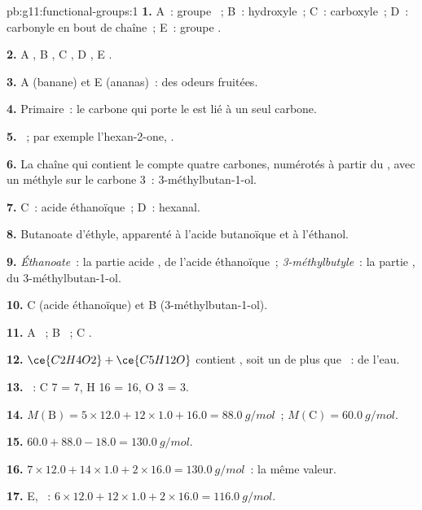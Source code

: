 \begin{solution}{pb:g11:functional-groups:1}
\textbf{1.} A~: groupe ~; B~: hydroxyle~; C~: carboxyle~; D~:
carbonyle en bout de chaîne~; E~: groupe .

\textbf{2.} A , B , C , D , E .

\textbf{3.} A (banane) et E (ananas)~: des odeurs fruitées.

\textbf{4.} Primaire~: le carbone qui porte le  est lié à un seul
carbone.

\textbf{5.} ~; par exemple l'hexan-2-one,
.

\textbf{6.} La chaîne qui contient le  compte quatre carbones,
numérotés à partir du , avec un méthyle sur le carbone 3~:
3-méthylbutan-1-ol.

\textbf{7.} C~: acide éthanoïque~; D~: hexanal.

\textbf{8.} Butanoate d'éthyle, apparenté à l'acide butanoïque et à
l'éthanol.

\textbf{9.} \emph{Éthanoate}~: la partie acide , de l'acide
éthanoïque~; \emph{3-méthylbutyle}~: la partie , du
3-méthylbutan-1-ol.

\textbf{10.} C (acide éthanoïque) et B (3-méthylbutan-1-ol).

\textbf{11.} A ~; B ~; C .

\textbf{12.} $\ce{C2H4O2} + \ce{C5H12O}$ contient , soit un
 de plus que ~: de l'eau.

\textbf{13.} ~: C 7 = 7, H 16 = 16,
O 3 = 3.

\textbf{14.} $M(\text{B}) = 5 \times 12.0 + 12 \times 1.0 + 16.0 =
\qty{88.0}{g/mol}$~; $M(\text{C}) = \qty{60.0}{g/mol}$.

\textbf{15.} $60.0 + 88.0 - 18.0 = \qty{130.0}{g/mol}$.

\textbf{16.} $7 \times 12.0 + 14 \times 1.0 + 2 \times 16.0 =
\qty{130.0}{g/mol}$~: la même valeur.

\textbf{17.} E, ~: $6 \times 12.0 + 12 \times 1.0 + 2 \times
16.0 = \qty{116.0}{g/mol}$.


\end{solution}
